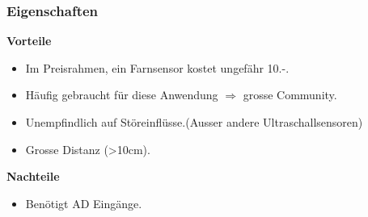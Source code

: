\subsubsection{Eigenschaften}

\textbf {Vorteile}
\begin{itemize}
\item Im Preisrahmen, ein Farnsensor kostet ungefähr 10.-.
\item Häufig gebraucht für diese Anwendung $\Rightarrow$ grosse Community.
\item Unempfindlich auf Störeinflüsse.(Ausser andere Ultraschallsensoren)
\item Grosse Distanz (>10cm).\\
\end{itemize}
\textbf {Nachteile}
\begin{itemize}
\item Benötigt  AD Eingänge.
\end{itemize}